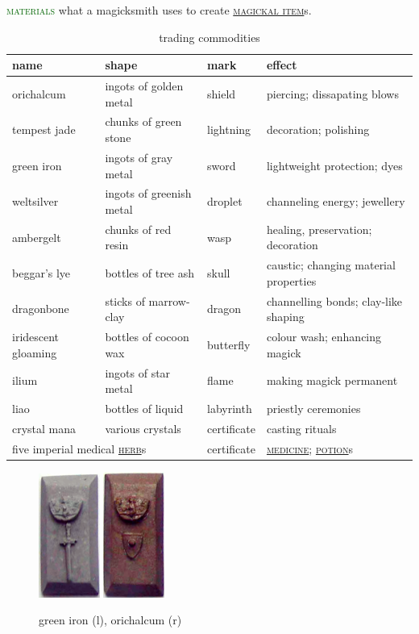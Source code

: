 \documentclass[twoside,11pt,b5paper,twocolumn]{scrbook}
\newcommand{\estcab}[1]{\textsc{\textcolor{marron}{#1}}}
\renewcommand{\paragraph}[1]{\par\noindent\markboth{#1}{#1}\estcab{\textcolor{darkgreen}{#1}}\label{#1} }
\newcommand{\see}[1]{{\estcab{\hyperref[#1]{#1}}}}
\begin{document}
\paragraph{materials} what a magicksmith uses to create \see{magickal item}s. \begin{table}\begin{tabular}{lllp{}}name& shape&mark&effect\\\hline orichalcum&ingots of golden metal & shield& piercing; dissapating blows \\ tempest jade & chunks of green stone & lightning & decoration; polishing \\ green iron & ingots of gray metal & sword & lightweight protection; dyes \\ weltsilver & ingots of greenish metal & droplet & channeling energy; jewellery \\ ambergelt & chunks of red resin & wasp & healing, preservation; decoration \\ beggar's lye & bottles of tree ash & skull & caustic; changing material properties \\ dragonbone & sticks of marrow-clay & dragon & channelling bonds; clay-like shaping \\ iridescent gloaming & bottles of cocoon wax & butterfly & colour wash; enhancing magick \\ ilium & ingots of star metal & flame & making magick permanent \\ liao & bottles of liquid & labyrinth & priestly ceremonies \\ crystal mana & various crystals & certificate & casting rituals \\ \multicolumn{2}{l}{five imperial medical \see{herb}s} & certificate & \see{medicine}; \see{potion}s \end{tabular}\caption{trading commodities}\end{table} \begin{figure}\centering\includegraphics[width=2cm]{encyclopedia/greeniron} \quad \includegraphics[width=2cm]{encyclopedia/orichalcum}\caption{green iron (l), orichalcum (r)}\end{figure}
\end{document}
